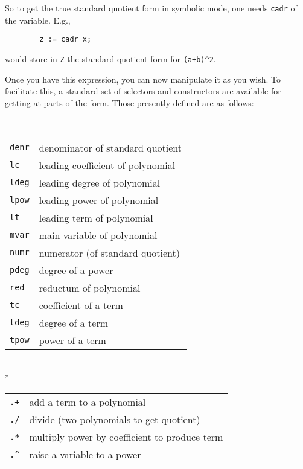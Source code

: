 So to get the true standard quotient form in symbolic mode, one needs
\texttt{cadr} of the variable. E.g.,
\begin{verbatim}
        z := cadr x;
\end{verbatim}
would store in \texttt{Z} the standard quotient form for
\texttt{(a+b)\textasciicircum 2}.

Once you have this expression, you can now manipulate it as you wish.  To
facilitate this, a standard set of selectors and
constructors are available for getting at parts of the
form.  Those presently defined are as follows:
\begin{description}
\renewcommand{\arraystretch}{1.5}

\item[REDUCE Selectors]\mbox{}\\[-2mm]
%
\begin{tabular}{lp{\rboxwidth}}
%
\texttt{denr} & denominator of standard quotient \\
%
\texttt{lc} & leading coefficient of polynomial \\
%
\texttt{ldeg} & leading degree of polynomial \\
%
\texttt{lpow} & leading power of polynomial \\
%
\texttt{lt} & leading term of polynomial \\
%
\texttt{mvar} & main variable of polynomial \\
%
\texttt{numr} & numerator (of standard quotient) \\
%
\texttt{pdeg} & degree of a power \\
%
\texttt{red} & reductum of polynomial \\
%
\texttt{tc} & coefficient of a term \\
%
\texttt{tdeg} & degree of a term \\
%
\texttt{tpow} & power of a term
\end{tabular}

\pagebreak
\item[REDUCE Constructors]\mbox{}\\*
%
\begin{tabular}{lp{\redboxwidth}}
\texttt{.+} & add a term to a polynomial \\
%
\texttt{./} & divide (two polynomials to get quotient) \\
\texttt{.*} & multiply power by coefficient to produce term \\
%
\texttt{.\textasciicircum} & raise a variable to a power
\end{tabular}
\end{description}

